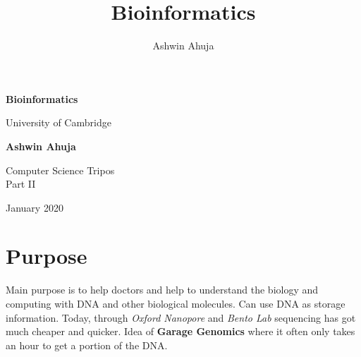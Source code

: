 \documentclass{article}
\title{Bioinformatics}
\author{Ashwin Ahuja}
\begin{document}
\begin{titlepage}
\begin{center}
			\vspace*{1cm}
			
			\Huge
			\textbf{Bioinformatics}
			
			\vspace{0.5cm}
			\LARGE
			University of Cambridge
			
			\vspace{1.5cm}
			
			\textbf{Ashwin Ahuja}
			
			\vfill
			
			Computer Science Tripos \\
			Part II
			
			\vspace{5cm}
			
			January 2020
			
\end{center}
\end{titlepage}

\tableofcontents
\pagebreak

\section{Purpose}
Main purpose is to help doctors and help to understand the biology and computing with DNA and other biological molecules. Can use DNA as storage information. Today, through \textit{Oxford Nanopore} and \textit{Bento Lab} sequencing has got much cheaper and quicker. Idea of \textbf{Garage Genomics} where it often only takes an hour to get a portion of the DNA.
\end{document}
